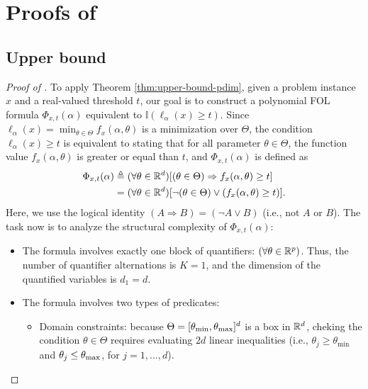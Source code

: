 \section{Proofs of }

\subsection{Upper bound}
\label{appendix:tuning-training}
\begin{proof}[Proof of ]
    To apply Theorem \ref{thm:upper-bound-pdim}, given a problem instance $x$ and a real-valued threshold $t$, our goal is to construct a polynomial FOL formula $\Phi_{x, t}(\alpha)$ equivalent to $\mathbb{I}(\ell_\alpha(x) \geq t)$. Since $\ell_\alpha(x) = \min_{\theta \in \Theta} f_x(\alpha, \theta)$ is a minimization over $\Theta$, the condition $\ell_\alpha(x) \geq t$ is equivalent to stating that for all parameter $\theta \in \Theta$, the function value $f_x(\alpha, \theta)$ is greater or equal than $t$, and $\Phi_{x, t}(\alpha)$ is defined as
    \begin{equation*}
        \begin{aligned}
            \Phi_{x, t}(\alpha) &\triangleq (\forall \theta \in \mathbb{R}^d)[(\theta \in \Theta) \Rightarrow f_x(\alpha, \theta) \geq t] \\
            &= (\forall \theta \in \mathbb{R}^d)[\neg (\theta \in \Theta) \lor (f_x(\alpha, \theta) \geq t)].
        \end{aligned}
    \end{equation*}
    Here, we use the logical identity $(A \Rightarrow B) =  (\neg A \lor B)$ (i.e., not $A$ or $B$). The task now is to analyze the structural complexity of $\Phi_{x, t}(\alpha)$:
    \begin{itemize}[leftmargin=*]
        \item The formula involves exactly one block of quantifiers: $(\forall \theta \in \mathbb{R}^p)$. Thus, the number of quantifier alternations is $K = 1$, and the dimension of the quantified variables is $d_1 = d$.
        \item The formula involves two types of predicates:
        \begin{itemize}[leftmargin=*]
            \item Domain constraints:  because $\Theta = [\theta_\textup{min}, \theta_\textup{max}]^d$ is a box in $\mathbb{R}^d$, cheking the condition $\theta \in \Theta$ requires evaluating $2d$ linear inequalities (i.e., $\theta_j \geq \theta_{\min}$ and $\theta_j \leq \theta_\textup{max}$, for $j = 1, \dots, d$).

\end{itemize}
\end{itemize}
\end{proof}

